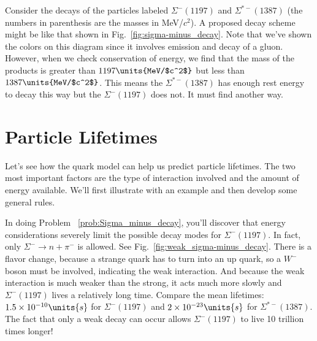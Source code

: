 Consider the decays of the particles labeled $\Sigma^-(1197)$ and
$\Sigma^{*-}(1387)$ (the numbers in parenthesis are the masses in
MeV/$c^2$).  A proposed decay scheme might be like that shown in
Fig.~\ref{fig:sigma-minus_decay}.  Note that we've shown the
colors on this diagram since it involves emission and decay of a
gluon. However, when we check conservation of energy, we find that
the mass of the products is greater than $1197\units{MeV/$c^2$}$ but less
than $1387\units{MeV/$c^2$}$.  This means the $\Sigma^{*-}(1387)$ has 
enough rest energy to decay this way but the $\Sigma^-(1197)$ does not.
It must find another way.

\section{Particle Lifetimes}
\label{sec:particle_lifetimes}

Let's see how the quark model can help us predict particle lifetimes.
The two most important factors are the type of interaction involved
and the amount of energy available.  We'll first illustrate with an
example and then develop some general rules.

In doing
Problem~
\ref{prob:Sigma_minus_decay},
you'll discover that energy considerations severely limit the possible
decay modes for $\Sigma^-(1197)$.  In fact, only $\Sigma^- \to n +
\pi^-$ is allowed.  See Fig.~\ref{fig:weak_sigma-minus_decay}.
There is a flavor change, because a strange quark has to turn into
an up quark, so a $W^-$ boson must be involved, indicating the weak
interaction.  And because the weak interaction is much weaker than the
strong, it acts much more slowly and $\Sigma^-(1197)$ lives a
relatively long time.  Compare the mean lifetimes: $1.5 \times 
10^{-10}\units{s}$
for $\Sigma^-(1197)$ and $2 \times 10^{-23}\units{s}$ for 
$\Sigma^{*-}(1387)$.
The fact that only a weak decay can occur allows $\Sigma^-(1197)$ to
live 10 trillion times longer!

